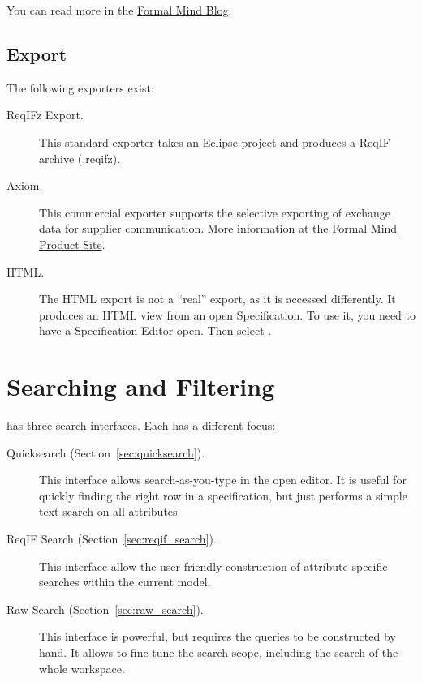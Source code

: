 You can read more in the \href{http://formalmind.com/blog/new-stuff-new-committer-new-product-new-importer-new-release}{Formal Mind Blog}.

\subsection{Export}

The following exporters exist:

\begin{description}
\item[ReqIFz Export.] This standard exporter takes an Eclipse project and produces a ReqIF archive (.reqifz).

\item[Axiom.] This commercial exporter supports the selective exporting of exchange data for supplier communication.  More information at the \href{http://formalmind.com/axiom}{Formal Mind Product Site}.

\item[HTML.] The HTML export is not a ``real'' export, as it is accessed differently.  It produces an HTML view from an open Specification.  To use it, you need to have a Specification Editor open.  Then select .
\end{description}

\section{Searching and Filtering}
\label{sec:search}

\pror{} has three search interfaces.  Each has a different focus:

\begin{description}
\item[Quicksearch (Section~\ref{sec:quicksearch}).] This interface allows search-as-you-type in the open editor.  It is useful for quickly finding the right row in a specification, but just performs a simple text search on all attributes.
\item[ReqIF Search (Section~\ref{sec:reqif_search}).] This interface allow the user-friendly construction of attribute-specific searches within the current model.
\item[Raw Search (Section~\ref{sec:raw_search}).] This interface is powerful, but requires the queries to be constructed by hand.  It allows to fine-tune the search scope, including the search of the whole workspace.
\end{description}

